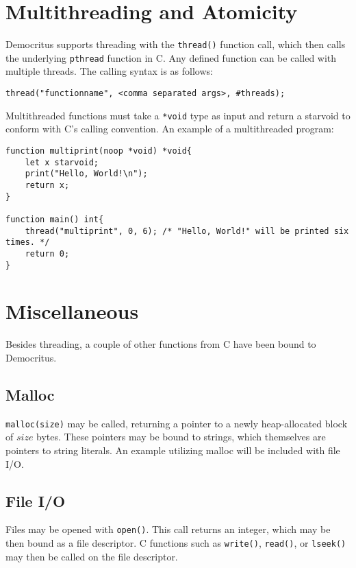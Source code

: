 \section{Multithreading and Atomicity}
	Democritus supports threading with the \texttt{thread()} function call, which then calls the underlying \texttt{pthread} function in C. Any defined function can be called with multiple threads. The calling syntax is as follows:
	\begin{lstlisting}
thread("functionname", <comma separated args>, #threads);
	\end{lstlisting}

	\noindent
	Multithreaded functions must take a \texttt{*void} type as input and return a starvoid to conform with C's calling convention. An example of a multithreaded program:

	\begin{lstlisting}
function multiprint(noop *void) *void{
	let x starvoid;
	print("Hello, World!\n");
	return x;
}

function main() int{
	thread("multiprint", 0, 6); /* "Hello, World!" will be printed six times. */
	return 0;
}

	\end{lstlisting}



\section{Miscellaneous}
	Besides threading, a couple of other functions from C have been bound to Democritus.

	\subsection{Malloc}
		\texttt{malloc(size)} may be called, returning a pointer to a newly heap-allocated block of $size$ bytes. These pointers may be bound to strings, which themselves are pointers to string literals. An example utilizing malloc will be included with file I/O.

	\subsection{File I/O}
		Files may be opened with \texttt{open()}. This call returns an integer, which may be then bound as a file descriptor. C functions such as \texttt{write()}, \texttt{read()}, or \texttt{lseek()} may then be called on the file descriptor. 

